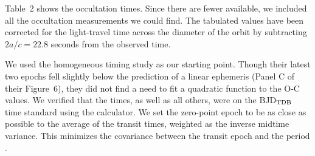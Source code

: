 \documentclass[12pt,twocolumn,tighten]{aastex62}
\begin{document}
Table~2 shows the occultation times.  Since there are fewer available,
we included all the occultation measurements we could find. The
tabulated values have been corrected for the light-travel time across
the diameter of the orbit by subtracting $2a/c = 22.8$ seconds from
the observed time.

We used the homogeneous \citet{hoyer_tramos_2013} timing study as our
starting point.  
Though their latest two epochs fell slightly below the prediction of a
linear ephemeris (Panel C of their Figure~6), they did not find a need
to fit a quadratic function to the O-C values.
We verified that the \citet{hoyer_tramos_2013} times, as well as all
others, were on the BJD$_{\rm TDB}$ time
standard using the \citet{eastman_achieving_2010} calculator.
We set the zero-point epoch to be as
close as possible to the average of the transit times, weighted as the
inverse midtime variance. This minimizes the covariance between the
transit epoch and the period \citep{gibson_gemini_2013}.
\end{document}
